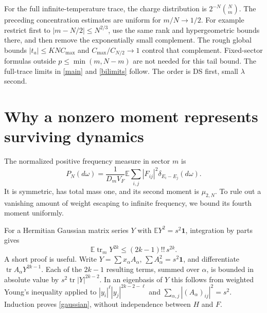 \documentclass[11pt,a4paper]{article}
\newcommand{\tr}{\operatorname{tr}}
\newcommand{\E}{\mathbb E}
\begin{document}
For the full infinite-temperature trace, the charge distribution
is $2^{-N}\binom Nm$. The preceding concentration estimates are
uniform for $m/N\to1/2$. For example restrict first to
$|m-N/2|\leq N^{2/3}$, use the same rank and hypergeometric
bounds there, and then remove the exponentially small complement.
The rough global bounds $|t_a|\leq K N C_{\max}$ and
$C_{\max}/C_{N/2}\to1$ control that complement. Fixed-sector
formulas outside $p\leq\min(m,N-m)$ are not needed for this tail
bound. The full-trace limits in \eqref{main} and
\eqref{bilimits} follow. The order is DS first, small $\lambda$ second.

\newpage
\section{Why a nonzero moment represents surviving dynamics}
The normalized positive frequency measure in sector $m$ is
\begin{equation}
 P_N(d\omega)=\frac1{D_mV_F}\E\sum_{i,j}|F_{ij}|^2
 \delta_{E_i-E_j}(d\omega).
\end{equation}
It is symmetric, has total mass one, and its second moment is
$\mu_{2,N}$. To rule out a vanishing amount of weight escaping to
infinite frequency, we bound its fourth moment uniformly.

For a Hermitian Gaussian matrix series $Y$ with
$\E Y^2=s^2\mathbf1$, integration by parts gives
\begin{equation}
 \E\tr_m Y^{2k}\leq(2k-1)!!\,s^{2k}.         \label{gaussian}
\end{equation}
A short proof is useful. Write $Y=\sum x_\alpha A_\alpha$,
$\sum A_\alpha^2=s^2\mathbf1$, and differentiate
$\tr A_\alpha Y^{2k-1}$. Each of the $2k-1$ resulting terms,
summed over $\alpha$, is bounded in absolute value by
$s^2\tr |Y|^{2k-2}$. In an eigenbasis of $Y$ this follows
from weighted Young's inequality applied to
$|y_i|^\ell|y_j|^{2k-2-\ell}$ and
$\sum_{\alpha,j}|(A_\alpha)_{ij}|^2=s^2$.
Induction proves \eqref{gaussian}, without independence between
$H$ and $F$.
\end{document}
